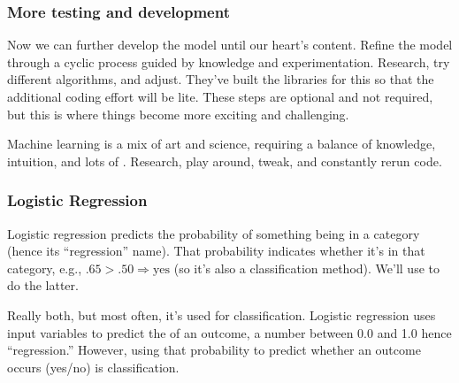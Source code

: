 \documentclass[letterpaper,10pt,english]{jupyterBook}
\begin{document}
\subsubsection{More testing and development}
\label{\detokenize{task2_c/example_sup_class/sup_class_ex-accuracy:more-testing-and-development}}
\sphinxAtStartPar
Now we can further develop the model until our heart’s content. Refine the model through a cyclic process guided by knowledge and experimentation. Research, try different algorithms, and adjust. They’ve built the libraries for this so that the additional coding effort will be lite. These steps are optional and not required, but this is where things become more exciting and challenging.

\sphinxAtStartPar
Machine learning is a mix of art and science, requiring a balance of knowledge, intuition, and lots of . Research, play around, tweak, and constantly re\sphinxhyphen{}run code.


\subsubsection{Logistic Regression}
\label{\detokenize{task2_c/example_sup_class/sup_class_ex-accuracy:logistic-regression}}
\sphinxAtStartPar
Logistic regression predicts the probability of something being in a category (hence its “regression” name). That probability indicates whether it’s in that category, e.g., \(.65 > .50 \Rightarrow \text{yes}\)  (so it’s also a classification method). We’ll use  to do the latter.

\begin{sphinxShadowBox}

\sphinxAtStartPar
Really both, but most often, it’s used for classification. Logistic regression uses input variables to predict the  of an outcome, a number between 0.0 and 1.0 \sphinxhyphen{}hence “regression.” However, using that probability to predict whether an outcome occurs (yes/no) is classification.
\end{sphinxShadowBox}
\end{document}
